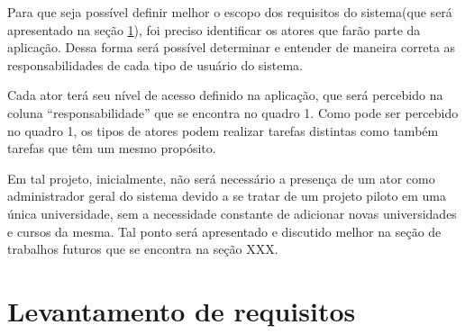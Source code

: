 Para que seja possível definir melhor o escopo dos requisitos do sistema(que será apresentado na seção \ref{requisitos}), foi preciso identificar os atores que farão parte da aplicação. Dessa forma será possível determinar e entender de maneira correta as responsabilidades de cada tipo de usuário do sistema. \par
Cada ator terá seu nível de acesso definido na aplicação, que será percebido na coluna “responsabilidade” que se encontra no quadro 1. Como pode ser percebido no quadro 1, os tipos de atores podem realizar tarefas distintas como também tarefas que têm um mesmo propósito. \par
Em tal projeto, inicialmente, não será necessário a presença de um ator como administrador geral do sistema devido a se tratar de um projeto piloto em uma única universidade, sem a necessidade constante de adicionar novas universidades e cursos da mesma. Tal ponto será apresentado e discutido melhor na seção de trabalhos futuros que se encontra na seção XXX.

\begin{table}[ht]
\centering
\caption{Tabela de atores do sistema}
\label{tab:atores}
\end{table}

\section{Levantamento de requisitos}\label{requisitos}

